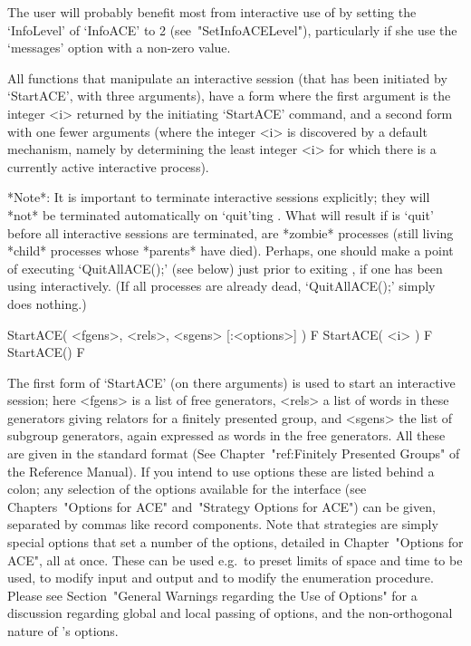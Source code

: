 
The user will probably benefit most from interactive use of {\ACE}  by
setting the `InfoLevel' of  `InfoACE'  to  2  (see~"SetInfoACELevel"),
particularly if she use the `messages' option with a non-zero value.

All functions that manipulate an interactive session  (that  has  been
initiated by `StartACE', with three arguments), have a form where  the
first  argument  is  the  integer  <i>  returned  by  the   initiating
`StartACE' command, and a second form with one fewer arguments  (where
the integer <i> is  discovered  by  a  default  mechanism,  namely  by
determining the least integer <i>  for  which  there  is  a  currently
active interactive {\ACE} process).

*Note*: It is  important  to  terminate  interactive  {\ACE}  sessions
explicitly; they will *not* be terminated automatically on  `quit'ting
{\GAP}. What will result if {\GAP} is `quit'  before  all  interactive
{\ACE} sessions are terminated, are *zombie* processes  (still  living
*child* processes whose *parents* have died). Perhaps, one should make
a point of executing `QuitAllACE();' (see below) just prior to exiting
{\GAP}, if one has been using {\ACE} interactively. (If all  processes
are already dead, `QuitAllACE();' simply does nothing.)


\>StartACE( <fgens>, <rels>, <sgens> [:<options>] ) F
\>StartACE( <i> ) F
\>StartACE() F

The first form of `StartACE' (on there arguments) is used to start  an
interactive session; here <fgens> is a list of free generators, <rels>
a list of words in these generators giving  relators  for  a  finitely
presented group, and <sgens> the list of  subgroup  generators,  again
expressed as words in the free generators. All these are given in  the
standard {\GAP} format (See Chapter~"ref:Finitely Presented Groups" of
the {\GAP} Reference Manual). If you intend to use options  these  are
listed behind a colon; any selection of the options available for  the
interface (see Chapters~"Options for ACE"  and~"Strategy  Options  for
ACE") can be given, separated by commas like record  components.  Note
that strategies are simply special options that set a  number  of  the
options, detailed in Chapter~"Options for ACE", all at once. These can
be used e.g.~to preset limits of space and time to be used, to  modify
input and output and to modify the enumeration procedure.  Please  see
Section~"General  Warnings  regarding  the  Use  of  Options"  for   a
discussion regarding global and local  passing  of  options,  and  the
non-orthogonal nature of {\ACE}'s options.

